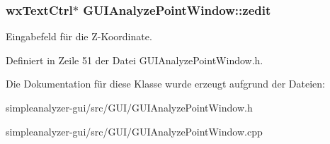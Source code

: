 \hypertarget{classGUIAnalyzePointWindow_a173e639b35cc6c18a74fb746b8664c8c}{
\subsubsection[{zedit}]{\setlength{\rightskip}{0pt plus 5cm}wx\-Text\-Ctrl$\ast$ G\-U\-I\-Analyze\-Point\-Window\-::zedit\hspace{0.3cm}{\ttfamily [private]}}}\label{classGUIAnalyzePointWindow_a173e639b35cc6c18a74fb746b8664c8c}
Eingabefeld für die Z-\/\-Koordinate. 

Definiert in Zeile 51 der Datei G\-U\-I\-Analyze\-Point\-Window.\-h.



Die Dokumentation für diese Klasse wurde erzeugt aufgrund der Dateien\-:\begin{DoxyCompactItemize}
\item 
simpleanalyzer-\/gui/src/\-G\-U\-I/G\-U\-I\-Analyze\-Point\-Window.\-h\item 
simpleanalyzer-\/gui/src/\-G\-U\-I/G\-U\-I\-Analyze\-Point\-Window.\-cpp\end{DoxyCompactItemize}
